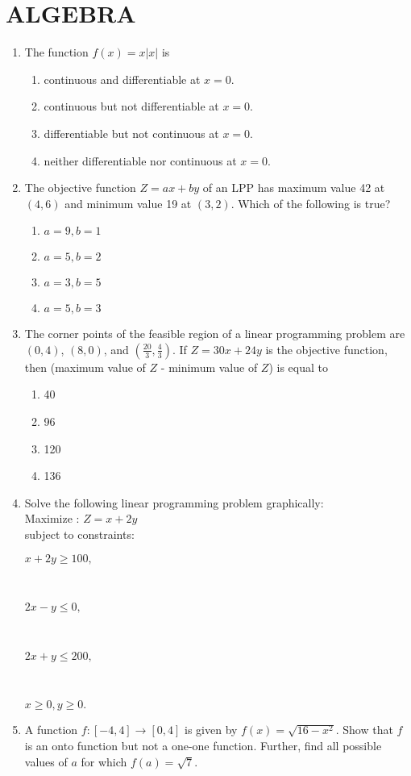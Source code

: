 \documentclass{article}
\begin{document}
\section{ALGEBRA}
\begin{enumerate}
\item The function $f(x) = x|x|$ is
\begin{enumerate}
\item continuous and differentiable at $x = 0.$
\item continuous but not differentiable at $x = 0.$
\item differentiable but not continuous at $x = 0.$
\item neither differentiable nor continuous at $x = 0.$
\end{enumerate}
\item The objective function $Z = ax + by$ of an LPP has maximum value 42 at $(4, 6)$ and minimum value 19 at $(3, 2)$. Which of the following is true?
\begin{enumerate}
\item $a = 9, b = 1$
\item $a = 5, b = 2$
\item $a = 3, b = 5$
\item $a = 5, b = 3$
\end{enumerate}
\item The corner points of the feasible region of a linear programming problem are $(0, 4)$, $(8, 0)$, and $(\frac{20}{3}, \frac{4}{3})$. If $Z = 30x + 24y$ is the objective function, then (maximum value of $Z$ - minimum value of $Z$) is equal to
\begin{enumerate}
\item 40
\item 96
\item 120
\item 136
\end{enumerate}
\item Solve the following linear programming problem graphically:\\ Maximize :  $Z = x + 2y$ \\
	subject to constraints:\\ 
		 \centerline{$x + 2y \geq 100,$}\\
		 \centerline{$2x - y \leq 0,$}\\
		 \centerline{$2x + y \leq 200,$}\\
		 \centerline{$x \geq 0,y \geq 0.$}
\item A function $f: [-4, 4] \to [0, 4]$ is given by $f(x) = \sqrt{16-x^2}$. Show that $f$ is an onto function but not a one-one function. Further, find all possible values of $a$ for which $f(a) = \sqrt{7}$.

\end{enumerate}
\end{document}
